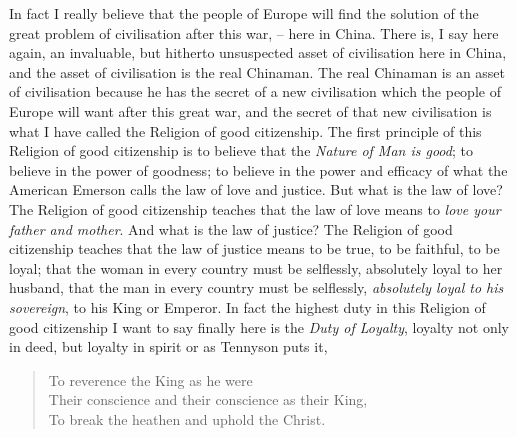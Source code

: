 In fact I really believe that the people of Europe will find the solution of the great problem of civilisation after this war,
-- here in China. There is, I say here again, an invaluable,
but hitherto unsuspected asset of civilisation here in China, and the asset of civilisation is the real Chinaman.
The real Chinaman is an asset of civilisation because he has the secret of a new civilisation which the people of Europe will want after this great war,
and the secret of that new civilisation is what I have called the Religion of good citizenship.
The first principle of this Religion of good citizenship is to believe that the \emph{Nature of Man is good};
to believe in the power of goodness; to believe in the power and efficacy of what the American Emerson calls the law of love and justice.
But what is the law of love?
The Religion of good citizenship teaches that the law of love means to \emph{love your father and mother}. And what is the law of justice?
The Religion of good citizenship teaches that the law of justice means to be true, to be faithful, to be loyal;
that the woman in every country must be selflessly, absolutely loyal to her husband,
that the man in every country must be selflessly, \emph{absolutely loyal to his sovereign}, to his King or Emperor.
In fact the highest duty in this Religion of good citizenship I want to say finally here is the \emph{Duty of Loyalty}, loyalty not only in deed,
but loyalty in spirit or as Tennyson puts it,
\begin{quote}
To reverence the King as he were \\
Their conscience and their conscience as their King, \\
To break the heathen and uphold the Christ.
\end{quote}
